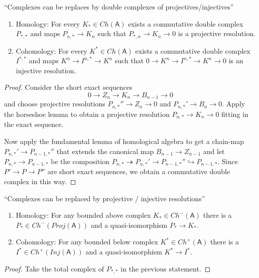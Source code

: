 \documentclass[fontsize=11pt,fleqn,a4paper]{scrartcl}
\begin{document}
\begin{corollary}
\enquote{Complexes can be replaces by double complexes of projectives/injectives}
\begin{multicols}{2}
\begin{enumerate}
\item Homology: For every $K_\ast\in Ch(\mathsf{A})$ exists a commutative double complex $P_{\ast,\ast}$ and maps $P_{n,\ast}\to K_n$ such that $P_{\ast,n} \to K_n \to 0$ is a projective resolution.
\item Cohomology: For every $K^\ast\in Ch(\mathsf{A})$ exists a commutative double complex $I^{\ast,\ast}$ and maps $K^n\to I^{n,\ast}\to K^n$ such that $0\to K^n\to I^{n,\ast} \to K^n \to 0$ is an injective resolution.
\end{enumerate}
\end{multicols}
\end{corollary}
\begin{proof}
Consider the short exact sequences
\[0\to Z_n \to K_n \to B_{n-1}\to 0\]
and choose projective resolutions $P_{n,\ast}''\to Z_n\to 0$ and $P_{n,\ast}'\to B_n\to 0$. Apply the horseshoe lemma to obtain a projective resolution $P_{n,\ast}\to K_n\to 0$ fitting in the exact sequence.

Now apply the fundamental lemma of homological algebra to get a chain-map  $P_{n,\ast}' \to P_{n-1,\ast}''$ that extends the canonical map $B_{n-1} \to Z_{n-1}$ and let $P_{n,\ast} \to P_{n-1,\ast}$ be the composition $P_{n,\ast} \twoheadrightarrow P_{n,\ast}' \to P_{n-1,\ast}'' \hookrightarrow P_{n-1,\ast}$. Since $P' \to P \to P''$ are short exact sequences, we obtain a commutative double complex in this way.
\end{proof}

\begin{theorem}
\enquote{Complexes can be replaced by projective / injective resolutions}

\begin{multicols}{2}
\begin{enumerate}
\item Homology: For any bounded above complex $K_\ast\in Ch^-(\mathsf{A})$ there is a $P_\ast \in Ch^-(Proj(\mathsf{A}))$ and a quasi-isomorphism $P_\ast \to K_\ast$.

\item Cohomology: For any bounded below complex $K^\ast\in Ch^+(\mathsf{A})$ there is a $I^\ast \in Ch^+(Inj(\mathsf{A}))$ and a quasi-isomorphism $K^\ast \to I^\ast$.
\end{enumerate}
\end{multicols}
\end{theorem}
\begin{proof}
Take the total complex of $P_{\ast,\ast}$ in the previous statement.
\end{proof}
\end{document}
